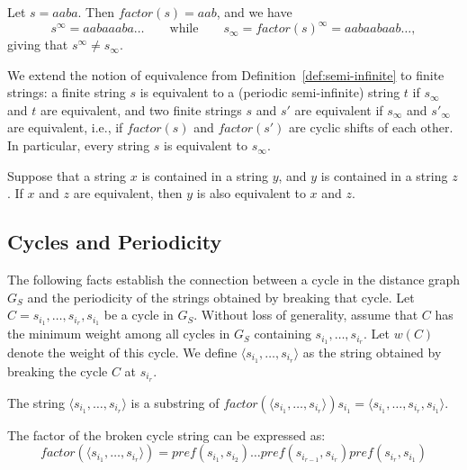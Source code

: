 \begin{example}
Let $s = aaba$. Then $\textit{factor}(s) = aab$, and we have
\[
s^\infty = aabaaaba\dots \qquad \text{while} \qquad s_\infty =
\textit{factor}(s)^\infty = aabaabaab\dots,
\]
giving that $s^\infty \neq s_\infty$.
\end{example}

We extend the notion of equivalence from Definition~\ref{def:semi-infinite} to
finite strings: a finite string $s$ is equivalent to a (periodic semi-infinite)
string $t$ if $s_\infty$ and $t$ are equivalent, and two finite strings $s$ and
$s'$ are equivalent if $s_\infty$ and $s'_\infty$ are equivalent, i.e., if
$\textit{factor}(s)$ and $\textit{factor}(s')$ are cyclic shifts of each other.
In particular, every string $s$ is equivalent to $s_\infty$.

\begin{lemma} \label{lemma:string_containment}
Suppose that a string $x$ is contained in a string $y$, and $y$ is contained in
a string $z$. If $x$ and $z$ are equivalent, then $y$ is also equivalent to $x$
and $z$.
\end{lemma}

\subsection{Cycles and Periodicity}
The following facts establish the connection between a cycle in the distance
graph $G_S$ and the periodicity of the strings obtained by breaking that cycle.
Let $C = s_{i_1}, \dots, s_{i_r}, s_{i_1}$ be a cycle in $G_S$. Without loss of
generality, assume that $C$ has the minimum weight among all cycles in $G_S$
containing $s_{i_1}, \dots, s_{i_r}$. Let $w(C)$ denote the weight of this
cycle. We define $\langle s_{i_1}, \dots, s_{i_r} \rangle$ as the string
obtained by breaking the cycle $C$ at $s_{i_r}$.

\begin{Fact} \label{lemma:cycle_substring}
The string $\langle s_{i_1}, \dots, s_{i_r} \rangle$ is a substring of
$\textit{factor}(\langle s_{i_1}, \dots, s_{i_r} \rangle)s_{i_1} = \langle
s_{i_1}, \dots, s_{i_r}, s_{i_1} \rangle$.
\end{Fact}

\begin{Fact} \label{lemma:cycle_factor}
The factor of the broken cycle string can be expressed as:
\begin{equation}
\textit{factor}(\langle s_{i_1}, \dots, s_{i_r} \rangle) = \textit{pref}(s_{i_1}, s_{i_2}) \dots \textit{pref}(s_{i_{r-1}}, s_{i_r}) \textit{pref}(s_{i_r}, s_{i_1})
\end{equation}
\end{Fact}

